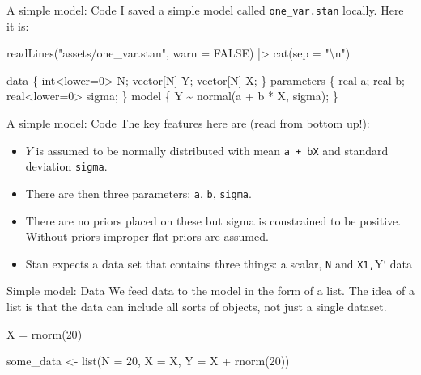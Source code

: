 \documentclass[
  11pt,
  ignorenonframetext,
]{beamer}
\newenvironment{Shaded}{\begin{snugshade}}{\end{snugshade}}
\newcommand{\AttributeTok}[1]{\textcolor[rgb]{0.40,0.45,0.13}{#1}}
\newcommand{\ConstantTok}[1]{\textcolor[rgb]{0.56,0.35,0.01}{#1}}
\newcommand{\DecValTok}[1]{\textcolor[rgb]{0.68,0.00,0.00}{#1}}
\newcommand{\FunctionTok}[1]{\textcolor[rgb]{0.28,0.35,0.67}{#1}}
\newcommand{\NormalTok}[1]{\textcolor[rgb]{0.00,0.23,0.31}{#1}}
\newcommand{\OtherTok}[1]{\textcolor[rgb]{0.00,0.23,0.31}{#1}}
\newcommand{\SpecialCharTok}[1]{\textcolor[rgb]{0.37,0.37,0.37}{#1}}
\newcommand{\StringTok}[1]{\textcolor[rgb]{0.13,0.47,0.30}{#1}}
\providecommand{\tightlist}{%
  \setlength{\itemsep}{0pt}\setlength{\parskip}{0pt}}\usepackage{longtable,booktabs,array}
\begin{document}
\begin{frame}[fragile]{A simple model: Code}
\protect\hypertarget{a-simple-model-code-1}{}
I saved a simple model called \texttt{one\_var.stan} locally. Here it
is:

\begin{Shaded}
\begin{Highlighting}[]
\FunctionTok{readLines}\NormalTok{(}\StringTok{"assets/one\_var.stan"}\NormalTok{, }\AttributeTok{warn =} \ConstantTok{FALSE}\NormalTok{) }\SpecialCharTok{|\textgreater{}}
    \FunctionTok{cat}\NormalTok{(}\AttributeTok{sep =} \StringTok{"}\SpecialCharTok{\textbackslash{}n}\StringTok{"}\NormalTok{)}
\end{Highlighting}
\end{Shaded}

data \{ int\textless lower=0\textgreater{} N; vector{[}N{]} Y;
vector{[}N{]} X; \} parameters \{ real a; real b;
real\textless lower=0\textgreater{} sigma; \} model \{ Y
\textasciitilde{} normal(a + b * X, sigma); \}
\end{frame}

\begin{frame}[fragile]{A simple model: Code}
\protect\hypertarget{a-simple-model-code-2}{}
The key features here are (read from bottom up!):

\begin{itemize}
\tightlist
\item
  \(Y\) is assumed to be normally distributed with mean
  \texttt{a\ +\ bX} and standard deviation \texttt{sigma}.
\item
  There are then three parameters: \texttt{a}, \texttt{b},
  \texttt{sigma}.
\item
  There are no priors placed on these but sigma is constrained to be
  positive. Without priors improper flat priors are assumed.
\item
  Stan expects a data set that contains three things: a scalar,
  \texttt{N} and \texttt{X1,}Y` data
\end{itemize}
\end{frame}

\begin{frame}[fragile]{Simple model: Data}
\protect\hypertarget{simple-model-data}{}
We feed data to the model in the form of a list. The idea of a list is
that the data can include all sorts of objects, not just a single
dataset.

\begin{Shaded}
\begin{Highlighting}[]
\NormalTok{X }\OtherTok{=} \FunctionTok{rnorm}\NormalTok{(}\DecValTok{20}\NormalTok{)}

\NormalTok{some\_data }\OtherTok{\textless{}{-}} \FunctionTok{list}\NormalTok{(}\AttributeTok{N =} \DecValTok{20}\NormalTok{, }\AttributeTok{X =}\NormalTok{ X, }\AttributeTok{Y =}\NormalTok{ X }\SpecialCharTok{+} \FunctionTok{rnorm}\NormalTok{(}\DecValTok{20}\NormalTok{))}
\end{Highlighting}
\end{Shaded}
\end{frame}
\end{document}
